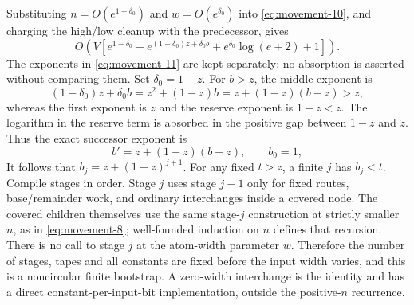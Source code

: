 Substituting $n=O(e^{1-\delta_0})$ and $w=O(e^{\delta_0})$ into
\eqref{eq:movement-10}, and charging the high/low cleanup with the predecessor, gives
\begin{equation}
 O\!\left(V\left[e^{1-\delta_0}
 +e^{(1-\delta_0)z+\delta_0b}
 +e^{\delta_0}\log(e+2)+1\right]\right).          \label{eq:movement-11}
\end{equation}
The exponents in \eqref{eq:movement-11} are kept separately: no absorption is asserted
without comparing them. Set $\delta_0=1-z$. For $b>z$, the middle
exponent is
\[
 (1-\delta_0)z+\delta_0b
   =z^2+(1-z)b=z+(1-z)(b-z)>z,
\]
whereas the first exponent is $z$ and the reserve exponent is $1-z<z$.
The logarithm in the reserve term is absorbed in the positive gap
between $1-z$ and $z$. Thus the exact successor exponent is
\[
 b'=z+(1-z)(b-z),\qquad b_0=1,
\]
It follows that $b_j=z+(1-z)^{j+1}$. For any fixed $t>z$, a finite $j$ has
$b_j<t$. Compile stages in order. Stage $j$ uses stage $j-1$ only for
fixed routes, base/remainder work, and ordinary interchanges inside a
covered node. The covered children themselves use the same stage-$j$
construction at strictly smaller $n$, as in \eqref{eq:movement-8}; well-founded
induction on $n$ defines that recursion. There is no call to stage $j$ at
the atom-width parameter $w$. Therefore
the number of stages, tapes and all constants are fixed before the input
width varies, and this is a noncircular finite bootstrap. A zero-width
interchange is the identity and has a direct constant-per-input-bit
implementation, outside the positive-$n$ recurrence.

